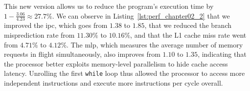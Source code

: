 \documentclass[12pt,a4paper,twoside,openright]{book}
\begin{document}

This new version allows us to reduce the program's execution time by $1 - \frac{3.06}{4.23} \approx 27.7\%$. We can observe in Listing~\ref{lst:perf_chapter02_2} that we improved the \gls{ipc}, which goes from $1.38$ to $1.85$, that we reduced the branch misprediction rate from $11.30\%$ to $10.16\%$, and that the L1 cache miss rate went from $4.71\%$ to $4.12\%$. The \gls{mlp}, which measures the average number of memory requests in flight simultaneously, also improves from $1.10$ to $1.35$, indicating that the processor better exploits memory-level parallelism to hide cache access latency. Unrolling the first \texttt{while} loop thus allowed the processor to access more independent instructions and execute more instructions per cycle overall.
\end{document}

